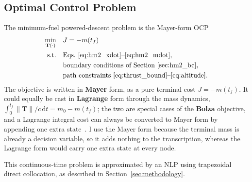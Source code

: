 \documentclass[../main.tex]{subfiles}
\begin{document}
\subsection{Optimal Control Problem}\label{sec:hm2_ocp}

The minimum-fuel powered-descent problem is the Mayer-form OCP
\begin{equation}
\begin{aligned}
    \min_{\mathbf{T}(\cdot)} \quad & J = -m(t_f) \\
    \text{s.t.}\quad & \text{Eqs.~\eqref{eq:hm2_xdot}--\eqref{eq:hm2_mdot}},\\
    & \text{boundary conditions of Section~\ref{sec:hm2_bc}},\\
    & \text{path constraints \eqref{eq:thrust_bound}--\eqref{eq:altitude}}.
\end{aligned}
\label{eq:OCP}
\end{equation}
The objective is written in \textbf{Mayer} form, as a pure terminal cost $J = -m(t_f)$. It could equally be cast in \textbf{Lagrange} form through the mass dynamics, $\int_0^{t_f}\!\|\mathbf{T}\|/c\,\mathrm{d}t = m_0 - m(t_f)$; the two are special cases of the \textbf{Bolza} objective, and a Lagrange integral cost can always be converted to Mayer form by appending one extra state~\cite[Sec.~4.4]{betts2010}. I use the Mayer form because the terminal mass is already a decision variable, so it adds nothing to the transcription, whereas the Lagrange form would carry one extra state at every node.

This continuous-time problem is approximated by an NLP using trapezoidal direct collocation, as described in Section~\ref{sec:methodology}.
\end{document}
